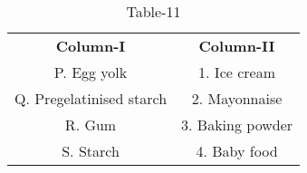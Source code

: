 \begin{table}[htbp]
  \centering
  \caption{Table-11}
  \label{tab:tables/table11.tex}
  \begin{tabular}{cc}
\textbf{Column-I} & \textbf{Column-II}\\

P. Egg yolk & 1. Ice cream \\
Q. Pregelatinised starch & 2. Mayonnaise \\
R. Gum & 3. Baking powder \\
S. Starch & 4. Baby food \\
  
  
  
  \end{tabular}
\end{table}